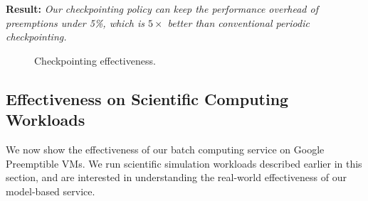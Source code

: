 \noindent \textbf{Result:} \emph{Our checkpointing policy can keep the performance overhead of preemptions under 5\%, which is $5\times$ better than conventional periodic checkpointing.}


\begin{figure}[t]
  \vspace*{\myfigspace}
\vspace*{\myfigspace}
  \caption{Checkpointing effectiveness.}
  \label{fig:ckpt-all}
  \vspace*{-0.3cm}
\end{figure}





\vspace*{\subsecspace}
\subsection{Effectiveness on Scientific Computing Workloads}

We now show the effectiveness of our batch computing service on Google Preemptible VMs.
We run scientific simulation workloads described earlier in this section, and are interested in understanding the real-world effectiveness of our model-based service.

